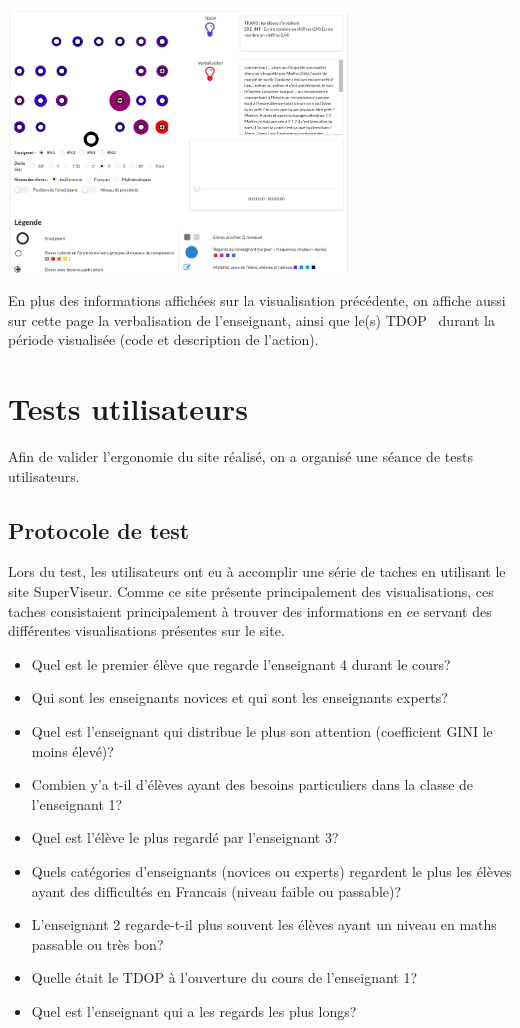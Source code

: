 \documentclass{article}
\begin{document}
\begin{itemize}
        \begin{center}
            \includegraphics[height=7cm]{rep_spatiale.png}
        \end{center}
        En plus des informations affichées sur la visualisation précédente, on affiche aussi sur cette page la verbalisation de l'enseignant, ainsi que le(s) TDOP~\cite{TDOP} durant la période visualisée (code et description de l'action).
\end{itemize}

\section{Tests utilisateurs}
Afin de valider l'ergonomie du site réalisé, on a organisé une séance de tests utilisateurs.

\subsection{Protocole de test}
Lors du test, les utilisateurs ont eu à accomplir une série de taches en utilisant le site SuperViseur. Comme ce site présente principalement des visualisations, ces taches consistaient principalement à trouver des informations en ce servant des différentes visualisations présentes sur le site.
\begin{itemize}
    \item Quel est le premier élève que regarde l'enseignant 4 durant le cours?
    \item Qui sont les enseignants novices et qui sont les enseignants experts?
    \item Quel est l'enseignant qui distribue le plus son attention (coefficient GINI le moins élevé)?
    \item Combien y'a t-il d'élèves ayant des besoins particuliers dans la classe de l'enseignant 1?
    \item Quel est l'élève le plus regardé par l'enseignant 3? 
    \item Quels catégories d'enseignants (novices ou experts) regardent le plus les élèves ayant des difficultés en Francais (niveau faible ou passable)?
    \item L'enseignant 2 regarde-t-il plus souvent les élèves ayant un niveau en maths passable ou très bon?
    \item Quelle était le TDOP à l'ouverture du cours de l'enseignant 1?
    \item Quel est l'enseignant qui a les regards les plus longs?
\end{itemize}
\end{document}
